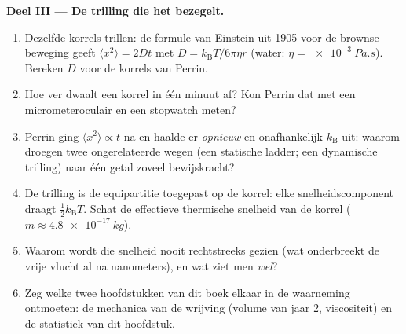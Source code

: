 \begin{problem}
\medskip\noindent\textbf{Deel III --- De trilling die het bezegelt.}
\begin{enumerate}[resume]
  \item Dezelfde korrels trillen: de formule van Einstein uit 1905 voor de
        brownse beweging geeft $\langle x^2\rangle = 2Dt$ met $D =
        k_{\text{B}}T/6\pi\eta r$ (water: $\eta =
        \qty{e-3}{Pa.s}$).
        Bereken $D$ voor de korrels van Perrin.
  \item Hoe ver dwaalt een korrel in één minuut af? Kon Perrin dat met een
        micrometeroculair en een stopwatch meten?
  \item Perrin ging $\langle x^2\rangle \propto t$ na en haalde er
        \emph{opnieuw} en onafhankelijk $k_{\text{B}}$ uit: waarom droegen
        twee ongerelateerde wegen (een statische ladder; een dynamische
        trilling) naar één getal zoveel bewijskracht?
  \item De trilling is de equipartitie toegepast op de korrel: elke
        snelheidscomponent draagt $\tfrac12 k_{\text{B}}T$. Schat de
        effectieve thermische snelheid van de korrel ($m \approx
        \qty{4.8e-17}{kg}$).
  \item Waarom wordt die snelheid nooit rechtstreeks gezien (wat
        onderbreekt de vrije vlucht al na nanometers), en wat ziet men
        \emph{wel}?
  \item Zeg welke twee hoofdstukken van dit boek elkaar in de waarneming
        ontmoeten: de mechanica van de wrijving (volume van jaar 2,
        viscositeit) en de statistiek van dit hoofdstuk.
\end{enumerate}


\end{problem}
